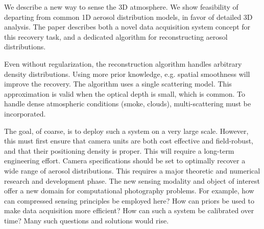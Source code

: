 \documentclass[10pt,letterpaper]{article}
\begin{document}
We describe a new way to sense the 3D atmosphere. We show feasibility
of departing from common 1D aerosol distribution models, in favor of
detailed 3D analysis.  The paper describes both a novel data
acquisition system concept for this recovery task, and a dedicated
algorithm for reconstructing aerosol distributions.

Even without regularization, the reconstruction algorithm handles
arbitrary density distributions. Using more prior knowledge,
e.g. spatial smoothness will improve the recovery.  The algorithm uses
a single scattering model. This approximation is valid when the
optical depth is small, which is common. To handle dense atmospheric
conditions (smoke, clouds), multi-scattering must be incorporated.

The goal, of coarse, is to deploy such a system on a very large
scale. However, this must first ensure that camera units are both cost
effective and field-robust, and that their positioning density is
proper. This will require a long-term engineering effort. Camera
specifications should be set to optimally recover a wide range of
aerosol distributions. This requires a major theoretic and numerical
research and development phase.  The new sensing modality and object
of interest offer a new domain for computational photography
problems. For example, how can compressed sensing principles be
employed here? How can priors be used to make data acquisition more
efficient? How can such a system be calibrated over time? Many such
questions and solutions would rise.


\end{document}
